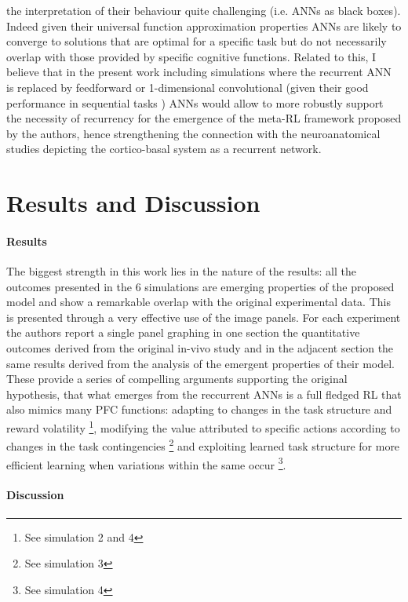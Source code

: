 \documentclass{article}
\begin{document}
the interpretation of their behaviour quite challenging  (i.e. ANNs as black boxes). Indeed given their universal function approximation properties \cite{hornik1989multilayer} ANNs are likely to converge to solutions that are optimal for a specific task but do not necessarily overlap with those provided by specific cognitive functions. Related to this, I believe that in the present work including simulations where the recurrent ANN is replaced by feedforward or 1-dimensional convolutional (given their good performance in sequential tasks \cite{kalchbrenner2014convolutional}) ANNs would allow to more robustly support the necessity of recurrency for the emergence of the meta-RL framework proposed by the authors, hence strengthening the connection with the neuroanatomical studies depicting the cortico-basal system as a recurrent network.

\section{Results and Discussion}
\label{results_discussion}

\paragraph{Results}
\label{results}
The biggest strength in this work lies in the nature of the results: all the outcomes presented in the 6 simulations are emerging properties of the proposed model and show a remarkable overlap with the original experimental data. This is presented through a very effective use of the image panels. For each experiment the authors report a single panel graphing in one section the quantitative outcomes derived from the original in-vivo study and in the adjacent section the same results derived from the analysis of the emergent properties of their model. These provide a series of compelling arguments supporting the original hypothesis, that what emerges from the reccurrent ANNs is a full fledged RL that also mimics many PFC functions: adapting to changes in the task structure and reward volatility \footnote{See simulation 2 and 4}, modifying the value attributed to specific actions according to changes in the task contingencies \footnote{See simulation 3} and exploiting learned task structure for more efficient learning when variations within the same occur \footnote{See simulation 4}. 

\paragraph{Discussion}
\end{document}
